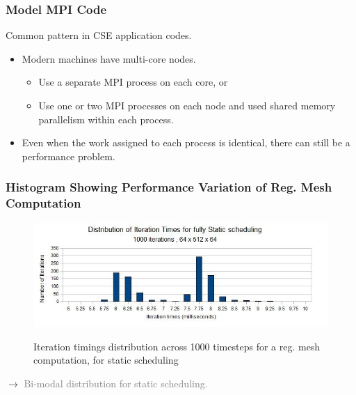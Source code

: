 \begin{frame}[label=modelMPICode]
  \frametitle{Model MPI Code} 
 Common pattern in CSE application codes.\\
  \vspace*{0.1in}

 
\begin{itemize}
\small \item \small Modern machines have multi-core nodes.
\begin{itemize}
\item \small Use a separate MPI process on each core, or 
\item \small Use one or two MPI processes on each node and used shared
  memory parallelism within each process.
\end{itemize}
\item \small Even when the work assigned to each process is identical, there can still be a performance problem.
\end{itemize} 
\end{frame}

\begin{frame}   
\frametitle{Histogram Showing Performance Variation of Reg. Mesh Computation}
\begin{figure}
\begin{center}                     
\includegraphics[scale=0.24]{plots/IterTimingsHisto-static}\\ 
\end{center}    
{\small Iteration timings distribution across 1000 timesteps for a reg. mesh computation, for static scheduling } 
\end{figure} 
\begin{center} 
{\small $\rightarrow$ \textcolor{gray}{Bi-modal distribution for static scheduling.}  } 
\end{center} 
\end{frame}                                     

